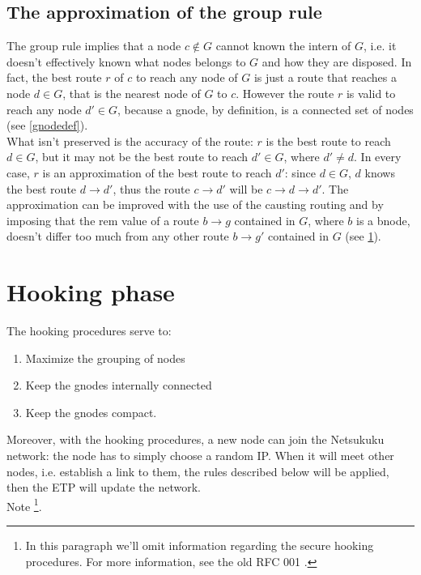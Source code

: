 \documentclass[a4paper]{article}
\begin{document}
\subsection{The approximation of the group rule}
\label{groupapprox}
The group rule implies that a node $c\notin G$ cannot known the
intern of $G$, i.e. it doesn't effectively known what nodes
belongs to $G$ and how they are disposed. In fact, the
best route $r$ of $c$ to reach any node of $G$ is just a route
that reaches a node $d\in G$, that is the nearest node of $G$
to $c$.
However the route $r$ is valid to reach any node $d'\in G$, because
a gnode, by definition, is a connected set of nodes (see
\ref{gnodedef}).\\
What isn't preserved is the accuracy of the route: $r$ is the
best route to reach $d\in G$, but it may not be the best route
to reach $d'\in G$, where $d'\neq d$. In every case, $r$ is an approximation
of the best route to reach $d'$: since $d\in G$, $d$ knows the best route
$d\rightarrow d'$, thus the route $c\rightarrow d'$ will be $c\rightarrow
d\rightarrow d'$.
The approximation can be improved with
the use of the causting routing \cite{caurout} and by imposing that the
rem value of a route $b\rightarrow g$ contained in $G$, where $b$ is a bnode, doesn't differ too much from
any other route $b\rightarrow g'$ contained in $G$ (see \ref{hooking}).

\section{Hooking phase}
\label{hooking}
The hooking procedures serve to:
\begin{enumerate}
	\item Maximize the grouping of nodes
	\item Keep the gnodes internally connected
	\item Keep the gnodes compact.
\end{enumerate}
Moreover, with the hooking procedures, a new node can join the Netsukuku network:
the node has to simply choose a random IP. When it will meet other nodes, i.e. establish a link to them, the rules
described below will be applied, then the ETP will update the network.\\Note \footnote{In this paragraph we'll omit information regarding the secure hooking
procedures. For more information, see the old RFC 001
\cite{gnodecontiguity}.}.
\end{document}
